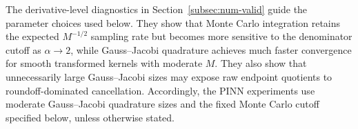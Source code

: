 The derivative-level diagnostics in Section~\ref{subsec:num-valid} guide the parameter choices used below.  They show that Monte Carlo integration retains the expected $M^{-1/2}$ sampling rate but becomes more sensitive to the denominator cutoff as $\alpha\to2$, while Gauss--Jacobi quadrature achieves much faster convergence for smooth transformed kernels with moderate $M$.  They also show that unnecessarily large Gauss--Jacobi sizes may expose raw endpoint quotients to roundoff-dominated cancellation.  Accordingly, the PINN experiments use moderate Gauss--Jacobi quadrature sizes and the fixed Monte Carlo cutoff specified below, unless otherwise stated.
